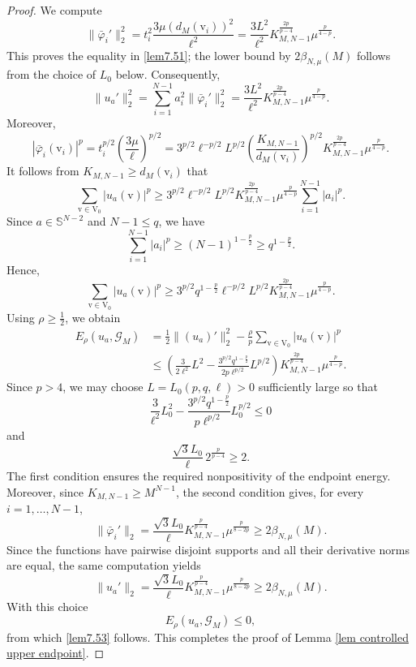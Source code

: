 \documentclass[10pt,a4paper]{amsart}
\newcommand{\G}{\mathcal{G}}
\newcommand{\V}{\mathrm{V}}
\newcommand{\vv}{\mathrm{v}}
\begin{document}
\begin{proof}
We compute
$$
\|\bar{\varphi}_i'\|_2^2
=
t_i^2\frac{3\mu \left(d_M(\vv_i)\right)^2}{\ell^2}= \frac{3L^2}{\ell^2}
K^{\frac{2p}{p-4}}_{M,N-1}
\mu^\frac{p}{4-p}.
$$
This proves the equality in \ref{lem7.51}; the lower bound by $2\beta_{N,\mu}(M)$ follows from the choice of $L_0$ below.
Consequently,
$$
\|u_a'\|_2^2
=\sum_{i=1}^{N-1}a_i^2\|\bar{\varphi}_i'\|_2^2= \frac{3L^2}{\ell^2}
K^{\frac{2p}{p-4}}_{M,N-1}
\mu^\frac{p}{4-p}.
$$
Moreover,
$$
|\bar{\varphi}_i(\vv_i)|^p
=
t_i^{p/2}
\left(\frac{3\mu}{\ell}\right)^{p/2}=
3^{p/2}\ell^{-p/2}L^{p/2}
\left(\frac{K_{M,N-1}}{d_M(\vv_i)}\right)^{p/2}
K^{\frac{2p}{p-4}}_{M,N-1}\mu^{\frac{p}{4-p}}.
$$
It follows from $K_{M,N-1} \geq d_M(\vv_i)$ that
$$
\sum_{\vv\in\V_0}|u_a(\vv)|^p
\geq
3^{p/2}\ell^{-p/2}L^{p/2}
K^{\frac{2p}{p-4}}_{M,N-1}\mu^{\frac{p}{4-p}}
\sum_{i=1}^{N-1}|a_i|^p.
$$
Since $a\in\mathbb S^{N-2}$ and $N-1\leq q$, we have
$$
\sum_{i=1}^{N-1}|a_i|^p
\geq
(N-1)^{1-\frac p2}
\geq
q^{1-\frac p2}.
$$
Hence,
$$
\sum_{\vv\in\V_0}|u_a(\vv)|^p
\geq
3^{p/2}q^{1-\frac p2}\ell^{-p/2}L^{p/2}
K^{\frac{2p}{p-4}}_{M,N-1}\mu^{\frac{p}{4-p}}.
$$
Using $\rho\geq\frac12$, we obtain
$$
\begin{aligned}
E_\rho(u_a,\G_M)
&=
\frac12\|(u_a)'\|_2^2
-
\frac{\rho}{p}
\sum_{\vv\in\V_0}|u_a(\vv)|^p
\\
&\leq
\left(
\frac{3}{2\ell^2}L^2
-
\frac{3^{p/2}q^{1-\frac p2}}{2p\ell^{p/2}}L^{p/2}
\right)
K^{\frac{2p}{p-4}}_{M,N-1}\mu^{\frac{p}{4-p}}.
\end{aligned}
$$
Since $p>4$, we may choose $L=L_0(p,q,\ell)>0$ sufficiently large so that
\[
\frac{3}{\ell^2}L_0^2
-
\frac{3^{p/2}q^{1-\frac p2}}{p\ell^{p/2}}L_0^{p/2}
\leq0
\]
and
\[
\frac{\sqrt{3}L_0}{\ell}\,2^{\frac{p}{p-4}}\geq2.
\]
The first condition ensures the required nonpositivity of the endpoint energy. Moreover, since $K_{M,N-1}\geq M^{N-1}$, the second condition gives, for every $i=1,\ldots,N-1$,
\[
\|\bar{\varphi}_i'\|_2
=\frac{\sqrt{3}L_0}{\ell}K_{M,N-1}^{\frac{p}{p-4}}
\mu^{\frac{p}{8-2p}}
\geq2\beta_{N,\mu}(M).
\]
Since the functions have pairwise disjoint supports and all their derivative norms are equal, the same computation yields
\[
\|u_a'\|_2
=\frac{\sqrt{3}L_0}{\ell}K_{M,N-1}^{\frac{p}{p-4}}
\mu^{\frac{p}{8-2p}}
\geq2\beta_{N,\mu}(M).
\]
With this choice
$$
E_\rho(u_a,\G_M)\leq 0,
$$ 
from which \ref{lem7.53} follows.
This completes the proof of Lemma \ref{lem controlled upper endpoint}.
\end{proof}
\end{document}
